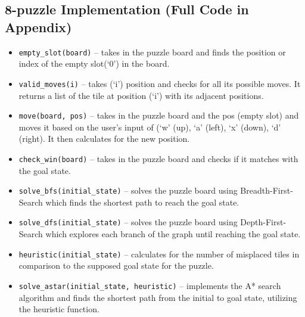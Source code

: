 \documentclass[journal]{./IEEE/IEEEtran}
\begin{document}
\subsection{8-puzzle Implementation (Full Code in Appendix)}
\begin{itemize}
  \item \texttt{empty\_slot(board)} – takes in the puzzle board and finds the position or index of the empty slot(‘0’) in the board.

  \item \texttt{valid\_moves(i)} – takes (‘i’) position and checks for all its possible moves. It returns a list of the tile at position (‘i’) with its adjacent positions.

  \item \texttt{move(board, pos)} – takes in the puzzle board and the pos (empty slot) and moves it based on the user’s input of (‘w’ (up), ‘a’ (left), ‘x’ (down), ‘d’ (right). It then calculates for the new position.

  \item \texttt{check\_win(board)} – takes in the puzzle board and checks if it matches with the goal state.

  \item \texttt{solve\_bfs(initial\_state)} – solves the puzzle board using Breadth-First-Search which finds the shortest path to reach the goal state.

  \item \texttt{solve\_dfs(initial\_state)} – solves the puzzle board using Depth-First-Search which explores each branch of the graph until reaching the goal state.

  \item \texttt{heuristic(initial\_state)} – calculates for the number of misplaced tiles in comparison to the supposed goal state for the puzzle.

  \item \texttt{solve\_astar(initial\_state, heuristic)} – implements the A* search algorithm and finds the shortest path from the initial to goal state, utilizing the heuristic function. 
\end{itemize}
\end{document}
